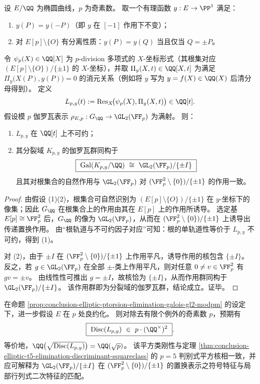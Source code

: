 \begin{proposition}\label{prop:conclusion-elliptic-ptorsion-elimination-galois-gl2-modpm}
设 \(E/\QQ\) 为椭圆曲线，\(p\) 为奇素数。
取一个有理函数 \(y:E\to\PP^1\) 满足：
\begin{enumerate}
  \item \(y(P)=y(-P)\)（即 \(y\) 在 \([-1]\) 作用下不变）；
  \item 对 \(E[p]\setminus\{O\}\) 有分离性质：\(y(P)=y(Q)\) 当且仅当 \(Q=\pm P\)。
\end{enumerate}
令 \(\psi_p(X)\in\QQ[X]\) 为 \(p\)-division 多项式的 \(X\)-坐标形式（其根集对应 \((E[p]\setminus\{O\})/\{\pm1\}\) 的 \(X\)-坐标），并取 \(\Pi_y(X,t)\in\QQ[X,t]\) 为满足 \(\Pi_y\bigl(X(P),y(P)\bigr)=0\) 的消元关系（例如将 \(y\) 写为 \(y=f(X)\in\QQ(X)\) 后清分母得到）。
定义
\[
L_{p,y}(t):=\operatorname{Res}_{X}\!\bigl(\psi_p(X),\Pi_y(X,t)\bigr)\in\QQ[t].
\]
假设模 \(p\) 伽罗瓦表示
\(
\rho_{E,p}:G_{\QQ}\to \GL_2(\FF_p)
\)
为满射。
则：
\begin{enumerate}
  \item \(L_{p,y}\) 在 \(\QQ[t]\) 上不可约；
  \item 其分裂域 \(K_{p,y}\) 的伽罗瓦群同构于
  \[
  \boxed{\ \mathrm{Gal}(K_{p,y}/\QQ)\ \cong\ \GL_2(\FF_p)/\{\pm I\}\ }
  \]
  且其对根集合的自然作用与 \(\GL_2(\FF_p)\) 对 \((\FF_p^2\setminus\{0\})/\{\pm1\}\) 的作用一致。
\end{enumerate}
\end{proposition}
\begin{proof}
由假设 (1)(2)，根集合可自然识别为 \((E[p]\setminus\{O\})/\{\pm1\}\) 在 \(y\)-坐标下的像集；因此 \(G_{\QQ}\) 在根集合上的作用由其在 \(E[p]\) 上的作用所诱导。
选定基 \(E[p]\cong \FF_p^2\) 后，\(G_{\QQ}\) 的像为 \(\GL_2(\FF_p)\)，从而在 \((\FF_p^2\setminus\{0\})/\{\pm1\}\) 上诱导出传递置换作用。
由“根轨道与不可约因子对应”可知：根的单轨道性等价于 \(L_{p,y}\) 不可约，得到 (1)。
\par
对 (2)，由于 \(\pm I\) 在 \((\FF_p^2\setminus\{0\})/\{\pm1\}\) 上作用平凡，诱导作用的核包含 \(\{\pm I\}\)。
反之，若 \(g\in\GL_2(\FF_p)\) 在全部 \(\pm\)-类上作用平凡，则对任意 \(0\neq v\in\FF_p^2\) 有 \(gv=\pm v\)。
由线性性可推出 \(g=\pm I\)，故核恰为 \(\{\pm I\}\)，从而作用群同构于 \(\GL_2(\FF_p)/\{\pm I\}\)。
该作用群即为分裂域的伽罗瓦群，结论成立。证毕。
\end{proof}

\begin{conjecture}\label{conj:conclusion-elliptic-ptorsion-discriminant-squareclass-p}
在命题 \ref{prop:conclusion-elliptic-ptorsion-elimination-galois-gl2-modpm} 的设定下，进一步假设 \(E\) 在 \(p\) 处良约化。
则对除去有限个例外的奇素数 \(p\)，预期有
\[
\boxed{\ \mathrm{Disc}(L_{p,y})\ \in\ p\cdot(\QQ^\times)^2\ }.
\]
等价地，\(\QQ\bigl(\sqrt{\mathrm{Disc}(L_{p,y})}\bigr)=\QQ(\sqrt p)\)。
该平方类刚性与定理 \ref{thm:conclusion-elliptic-t5-elimination-discriminant-squareclass} 的 \(p=5\) 判别式平方核相一致，并应可解释为
\(\GL_2(\FF_p)/\{\pm I\}\) 在 \((\FF_p^2\setminus\{0\})/\{\pm1\}\) 的置换表示之符号特征与局部行列式二次特征的匹配。
\end{conjecture}

